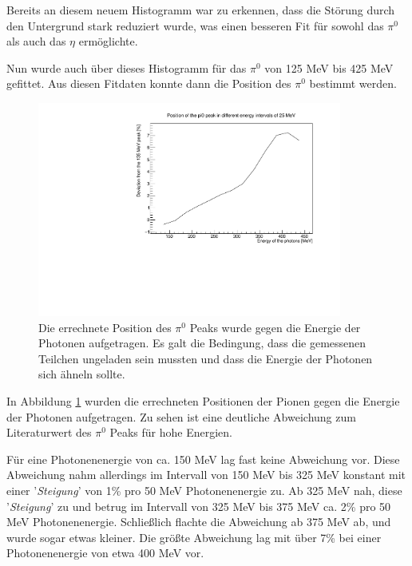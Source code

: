 \documentclass[a4paper,11pt,oneside,final,german,openbib,pdftex]{scrbook}
\begin{document}
{ Bereits an diesem neuem Histogramm war zu erkennen, dass die St\"orung durch den Untergrund stark reduziert wurde, was einen besseren Fit f\"ur sowohl das $\pi^0$ als auch das $\eta$ erm\"oglichte. %
 
 Nun wurde auch \"uber dieses Histogramm f\"ur das $\pi^0$ von 125 MeV bis 425 MeV gefittet.
 Aus diesen Fitdaten konnte dann die Position des $\pi^0$ bestimmt werden. 
 
 \begin{figure}[h!]
 	\begin{center}
 		\includegraphics[width=100mm]{20172803SymmetricUnchargedDeviation}
 	
 		\caption{Die errechnete Position des $\pi^0$ Peaks wurde gegen die Energie der Photonen aufgetragen.
 			Es galt die Bedingung, dass die gemessenen Teilchen ungeladen sein mussten und dass die Energie der Photonen sich \"ahneln sollte.
 		} 
 		\label{fig.Energydependency_pion}
 	\end{center}
 \end{figure}

In Abbildung \ref{fig.Energydependency_pion} wurden die errechneten Positionen der Pionen gegen die Energie der Photonen aufgetragen. Zu sehen ist eine deutliche Abweichung zum Literaturwert des $\pi^0$ Peaks für hohe Energien. 

Für eine Photonenenergie von ca. 150 MeV lag fast keine Abweichung vor. Diese Abweichung nahm allerdings im Intervall von 150 MeV bis 325 MeV konstant mit einer '\textit{Steigung}' von 1\% pro 50 MeV Photonenenergie zu. Ab 325 MeV nah, diese '\textit{Steigung}' zu und betrug im Intervall von 325 MeV bis 375 MeV ca. 2\% pro 50 MeV Photonenenergie. Schließlich flachte die Abweichung ab 375 MeV ab, und wurde sogar etwas kleiner. Die größte Abweichung lag mit über 7\% bei einer Photonenenergie von etwa 400 MeV vor.

}
\end{document}
